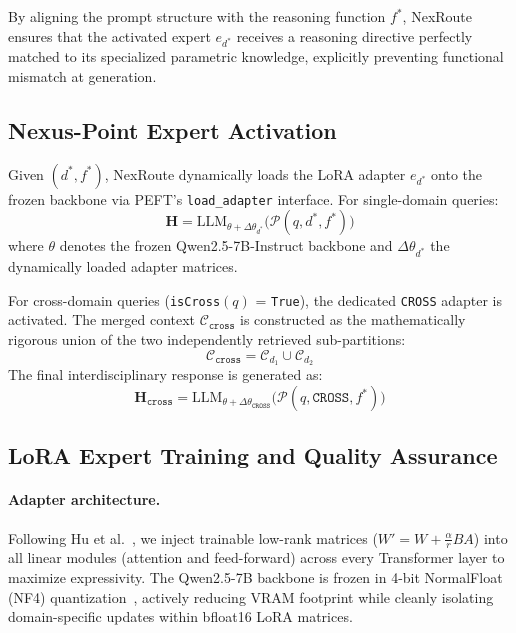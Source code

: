 \documentclass[a4paper,fleql]{cas-sc}
\begin{document}
By aligning the prompt structure with the reasoning function $f^*$,
NexRoute ensures that the activated expert $e_{d^*}$ receives a reasoning
directive perfectly matched to its specialized parametric knowledge,
explicitly preventing functional mismatch at generation.
\subsection{Nexus-Point Expert Activation}
\label{ssec:nexus}
Given $(d^*, f^*)$, NexRoute dynamically loads the LoRA adapter $e_{d^*}$
onto the frozen backbone via PEFT's \texttt{load\_adapter} interface.
For single-domain queries:
\begin{equation}
    \mathbf{H} = \text{LLM}_{\theta + \Delta\theta_{d^*}} \big(
    \mathcal{P}(q, d^*, f^*) \big)
    \label{eq:single}
\end{equation}
where $\theta$ denotes the frozen Qwen2.5-7B-Instruct backbone and
$\Delta\theta_{d^*}$ the dynamically loaded adapter matrices.

For cross-domain queries (\texttt{isCross}$(q)$ = \texttt{True}), the
dedicated \texttt{CROSS} adapter is activated. The merged context
$\mathcal{C}_{\texttt{cross}}$ is constructed as the mathematically rigorous
union of the two independently retrieved sub-partitions:
\begin{equation}
    \mathcal{C}_{\texttt{cross}} = \mathcal{C}_{d_1} \cup \mathcal{C}_{d_2}
    \label{eq:cross_ctx}
\end{equation}
The final interdisciplinary response is generated as:
\begin{equation}
    \mathbf{H}_{\texttt{cross}} = \text{LLM}_{\theta +
    \Delta\theta_{\texttt{CROSS}}}
    \big( \mathcal{P}(q, \texttt{CROSS}, f^*) \big)
    \label{eq:cross_gen}
\end{equation}

\subsection{LoRA Expert Training and Quality Assurance}
\label{ssec:loratrain}
\paragraph{Adapter architecture.}
Following Hu et al.~\citep{hu2022lora}, we inject trainable low-rank matrices ($W' = W + \frac{\alpha}{r} BA$) into all linear modules (attention and feed-forward) across every Transformer layer to maximize expressivity. The Qwen2.5-7B backbone is frozen in 4-bit NormalFloat (NF4) quantization~\citep{dettmers2023qlora}, actively reducing VRAM footprint while cleanly isolating domain-specific updates within bfloat16 LoRA matrices.
\end{document}
